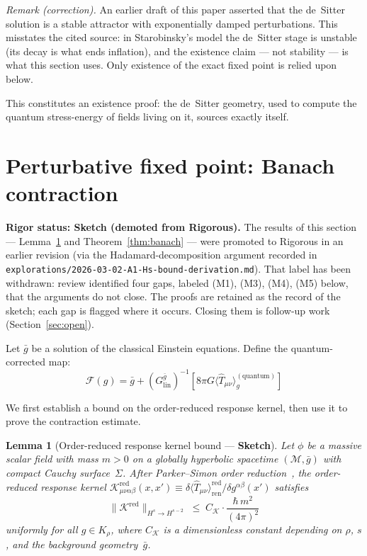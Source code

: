 \documentclass[12pt,a4paper]{article}
\newtheorem{lemma}{Lemma}
\begin{document}
\smallskip\noindent\emph{Remark (correction).} An earlier draft of this paper asserted
that the de~Sitter solution is a stable attractor with exponentially damped perturbations.
This misstates the cited source: in Starobinsky's model the de~Sitter stage is unstable
(its decay is what ends inflation), and the existence claim --- not stability --- is what
this section uses. Only existence of the exact fixed point is relied upon below.

This constitutes an existence proof: the de~Sitter geometry, used to compute the quantum
stress-energy of fields living on it, sources exactly itself.

\section{Perturbative fixed point: Banach contraction}
\label{sec:banach}

\noindent\textbf{Rigor status: Sketch (demoted from Rigorous).} The results of this
section --- Lemma~\ref{lem:kernel_bound} and Theorem~\ref{thm:banach} --- were promoted
to Rigorous in an earlier revision (via the Hadamard-decomposition argument recorded in
\texttt{explorations/2026-03-02-A1-Hs-bound-derivation.md}). That label has been
withdrawn: review identified four gaps, labeled (M1), (M3), (M4), (M5) below, that the
arguments do not close. The proofs are retained as the record of the sketch; each gap is
flagged where it occurs. Closing them is follow-up work (Section~\ref{sec:open}).

\medskip

Let $\bar{g}$ be a solution of the classical Einstein equations. Define the
quantum-corrected map:
\begin{equation}
\mathcal{F}(g) = \bar{g} + (G^{\bar{g}}_{\text{lin}})^{-1}\!\left[8\pi G\langle\hat{T}_{\mu\nu}\rangle^{(\text{quantum})}_g\right]
\end{equation}

\noindent We first establish a bound on the order-reduced response kernel, then use it
to prove the contraction estimate.

\begin{lemma}[Order-reduced response kernel bound --- \textbf{Sketch}]
\label{lem:kernel_bound}
Let $\phi$ be a massive scalar field with mass $m > 0$ on a globally hyperbolic spacetime
$(\mathcal{M},\bar{g})$ with compact Cauchy surface~$\Sigma$. After Parker--Simon order
reduction~\emph{\cite{parker_simon}}, the order-reduced response kernel
$\mathcal{K}^{\mathrm{red}}_{\mu\nu\alpha\beta}(x,x')
\equiv \delta\langle\hat{T}_{\mu\nu}\rangle^{\mathrm{red}}_{\mathrm{ren}}/\delta g^{\alpha\beta}(x')$
satisfies
\begin{equation}
\bigl\|\mathcal{K}^{\mathrm{red}}\bigr\|_{H^s \to H^{s-2}}
\;\leq\; C_{\mathcal{K}} \cdot \frac{\hbar\, m^2}{(4\pi)^2}
\label{eq:kernel_bound}
\end{equation}
uniformly for all $g \in K_\rho$, where $C_{\mathcal{K}}$ is a dimensionless constant
depending on $\rho$, $s$, and the background geometry~$\bar{g}$.
\end{lemma}
\end{document}
